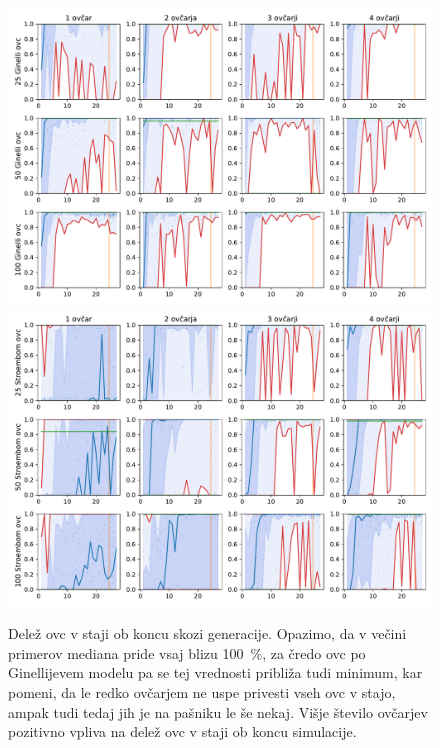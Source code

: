 \begin{figure}[H]  %
	\centering
	\includegraphics[height=0.4\textheight]{../poglavja/grafi/Ginelli-evolucija-Uspeh.pdf}
	\includegraphics[height=0.4\textheight]{../poglavja/grafi/Stroembom-evolucija-Uspeh.pdf}
	\caption[Delež ovc v staji ob koncu skozi generacije]{Delež ovc v staji ob koncu skozi generacije. Opazimo, da v večini primerov mediana pride vsaj blizu 100~\%, za čredo ovc po Ginellijevem modelu pa se tej vrednosti približa tudi minimum, kar pomeni, da le redko ovčarjem ne uspe privesti vseh ovc v stajo, ampak tudi tedaj jih je na pašniku le še nekaj. Višje število ovčarjev pozitivno vpliva na delež ovc v staji ob koncu simulacije.} %
	\label{fig:uspeh}
\end{figure}

